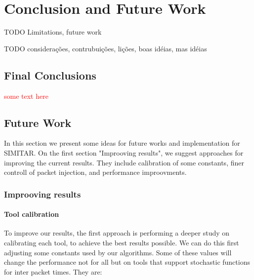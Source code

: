 \chapter{Conclusion and Future Work}\label{ch:conclusion}


TODO Limitations, future work

TODO considerações, contrubuições, lições, boas idéias, mas idéias

\section{Final Conclusions}

\textcolor{red}{some text here}

\section{Future Work}

In this section we present some ideas for future works and implementation for SIMITAR. On the first section "Improoving results", we suggest approaches for improving the current results. They include calibration of some constants, finer controll of packet injection, and performance improovments. 

\subsection{Improoving results}

\subsubsection{Tool calibration}

To improve our results, the first approach is performing a deeper study on calibrating each tool, to achieve the best results possible. We can do this first adjusting some constants used by our algorithms. Some of these values will change the performance not for all but on tools that support stochastic functions for inter packet times. They are:

